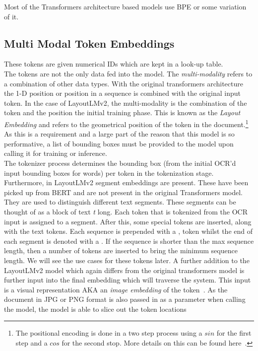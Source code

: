Most of the Transformers architecture based models use BPE or some variation of it.
\subsection{Multi Modal Token Embeddings}
These tokens are given numerical IDs which are kept in a look-up table.\\
The tokens are not the only data fed into the model. The \emph{multi-modality} refers to a combination of other data types. With the original
transformers architecture the 1-D position or position in a sequence is combined with the original input token.
\bigbreak
In the case of LayoutLMv2, the multi-modality is the combination of the token and the position the initial training phase.
This is known as the \emph{Layout Embedding} and refers to the geometrical position of the token in the document.\footnote{The
	positional encoding is done in a two step process using a $sin$ for the first step and a $cos$ for the second stop. More details
	on this can be found here~\autocite{doshiTransformersExplainedVisually2021c}.}
As this is a requirement and a large part of the reason that this model is so performative, a list of bounding boxes must be provided to the model
upon calling it for training or inference. \\
The tokenizer process determines the bounding box (from the initial OCR'd input bounding boxes for words) per token in the tokenization stage.
\bigbreak
Furthermore, in LayoutLMv2 segment embeddings are present. These have been picked up from BERT and are not present in the
original Transformers model. They are used to distinguish different text segments. These segments can be thought of as a block of text
\emph{t} long. Each token that is tokenized from the OCR input is assigned to a segment.
\bigbreak
After this, some special tokens are inserted, along with the text tokens. Each sequence is prepended with a \code{[CLS]}, token
whilst the end of each segment is denoted with a \code{[SEP]}. If the sequence is shorter than the max sequence length, then
a number of \code{[PAD]} tokens are inserted to bring the minimum sequence length. We will see the use cases for these tokens
later.
\bigbreak
A further addition to the LayoutLMv2 model which again differs from the original transformers model is further input into the final embedding which
will traverse the system. This input is a visual representation AKA an \emph{image embedding} of the token~\autocite{LayoutLMExplained2022}.
As the document in JPG or PNG format is also passed in as a parameter when calling the model, the model is able to slice out the token locations
